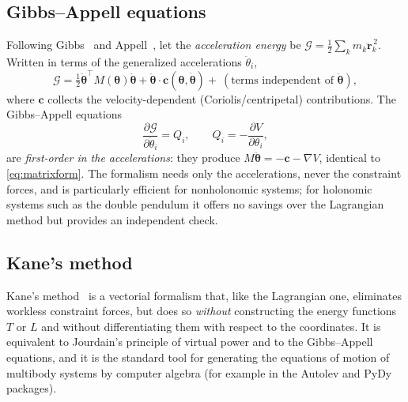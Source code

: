 \documentclass[11pt,a4paper]{book}
\theoremstyle{definition}
\theoremstyle{remark}
\begin{document}
\subsection{Gibbs--Appell equations}

Following Gibbs~\cite{gibbs} and Appell~\cite{appell}, let the \emph{acceleration energy} be
$\mathcal G=\tfrac12\sum_km_k\ddot{\bm r}_k^{\,2}$. Written in terms of the generalized accelerations $\ddot\theta_i$,
\begin{equation}
  \mathcal G=\tfrac12\ddot{\bm\theta}^{\top}M(\bm\theta)\ddot{\bm\theta}+\ddot{\bm\theta}\cdot\bm c(\bm\theta,\dot{\bm\theta})
  +\ (\text{terms independent of }\ddot{\bm\theta}),
\end{equation}
where $\bm c$ collects the velocity-dependent (Coriolis/centripetal) contributions. The Gibbs--Appell equations
\begin{equation}
  \frac{\partial\mathcal G}{\partial\ddot\theta_i}=Q_i,\qquad Q_i=-\frac{\partial V}{\partial\theta_i},
\end{equation}
are \emph{first-order in the accelerations}: they produce $M\ddot{\bm\theta}=-\bm c-\nabla V$, identical to
\eqref{eq:matrixform}. The formalism needs only the accelerations, never the constraint forces, and is particularly
efficient for nonholonomic systems; for holonomic systems such as the double pendulum it offers no savings over the
Lagrangian method but provides an independent check.

\subsection{Kane's method}
\label{sec:kane}

Kane's method~\cite{kane1961,kanewang,kanelevinson} is a vectorial formalism that, like the Lagrangian one,
eliminates workless constraint forces, but does so \emph{without} constructing the energy functions $T$ or $L$
and without differentiating them with respect to the coordinates. It is equivalent to Jourdain's principle of
virtual power and to the Gibbs--Appell equations, and it is the standard tool for generating the equations of
motion of multibody systems by computer algebra (for example in the Autolev and PyDy packages).
\end{document}
